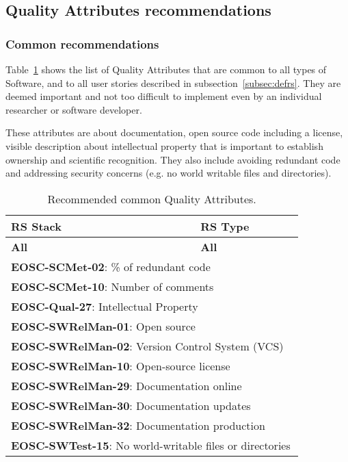 \subsection{Quality Attributes recommendations}
\label{subsec:attributesrecomen}

\subsubsection{Common recommendations}

Table~\ref{tab:rs_recc00} shows the list of Quality Attributes that are common to all types of Software, and to all user stories described in subsection~\ref{subsec:defrs}. They are deemed important and not too difficult to implement even by an individual researcher or software developer.

These attributes are about documentation, open source code including a license, visible description about intellectual property that is important to establish ownership and scientific recognition. They also include avoiding redundant code and addressing security concerns (e.g. no world writable files and directories).

\begin{table}[h]
  \centering
  \scriptsize
  \begin{tabular}{|p{0.55\linewidth}|p{0.3\linewidth}|} \hline

    \textbf{RS Stack} & \textbf{RS Type} \\ \hline \hline
    \textbf{All} & \textbf{All} \\ \hline
    \multicolumn{2}{|l|}{\textbf{EOSC-SCMet-02}: \% of redundant code} \\ \hline
    \multicolumn{2}{|l|}{\textbf{EOSC-SCMet-10}: Number of comments} \\ \hline
    \multicolumn{2}{|l|}{\textbf{EOSC-Qual-27}: Intellectual Property} \\ \hline
    \multicolumn{2}{|l|}{\textbf{EOSC-SWRelMan-01}: Open source} \\ \hline
    \multicolumn{2}{|l|}{\textbf{EOSC-SWRelMan-02}: Version Control System (VCS)} \\ \hline
    \multicolumn{2}{|l|}{\textbf{EOSC-SWRelMan-10}: Open-source license} \\ \hline
    \multicolumn{2}{|l|}{\textbf{EOSC-SWRelMan-29}: Documentation online} \\ \hline
    \multicolumn{2}{|l|}{\textbf{EOSC-SWRelMan-30}: Documentation updates} \\ \hline
    \multicolumn{2}{|l|}{\textbf{EOSC-SWRelMan-32}: Documentation production} \\ \hline
    \multicolumn{2}{|l|}{\textbf{EOSC-SWTest-15}: No world-writable files or directories} \\ \hline

  \end{tabular}
  \caption{Recommended common Quality Attributes.}
  \label{tab:rs_recc00}
\end{table}


